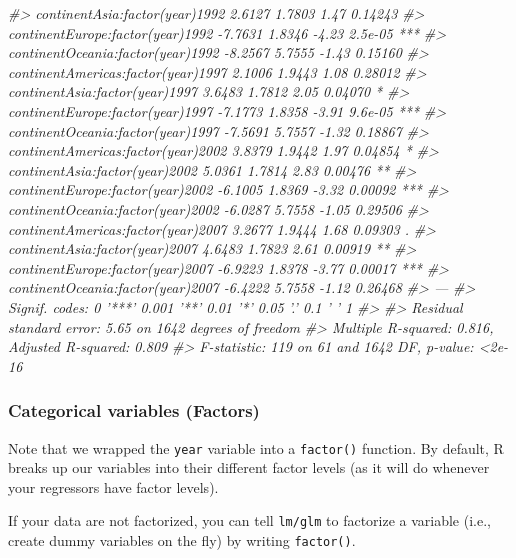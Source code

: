 \documentclass[
]{book}
\newenvironment{Shaded}{\begin{snugshade}}{\end{snugshade}}
\newcommand{\CommentTok}[1]{\textcolor[rgb]{0.56,0.35,0.01}{\textit{#1}}}
\begin{document}
\begin{Shaded}
\begin{Highlighting}[]
\CommentTok{#> continentAsia:factor(year)1992       2.6127     1.7803    1.47  0.14243    }
\CommentTok{#> continentEurope:factor(year)1992    -7.7631     1.8346   -4.23  2.5e-05 ***}
\CommentTok{#> continentOceania:factor(year)1992   -8.2567     5.7555   -1.43  0.15160    }
\CommentTok{#> continentAmericas:factor(year)1997   2.1006     1.9443    1.08  0.28012    }
\CommentTok{#> continentAsia:factor(year)1997       3.6483     1.7812    2.05  0.04070 *  }
\CommentTok{#> continentEurope:factor(year)1997    -7.1773     1.8358   -3.91  9.6e-05 ***}
\CommentTok{#> continentOceania:factor(year)1997   -7.5691     5.7557   -1.32  0.18867    }
\CommentTok{#> continentAmericas:factor(year)2002   3.8379     1.9442    1.97  0.04854 *  }
\CommentTok{#> continentAsia:factor(year)2002       5.0361     1.7814    2.83  0.00476 ** }
\CommentTok{#> continentEurope:factor(year)2002    -6.1005     1.8369   -3.32  0.00092 ***}
\CommentTok{#> continentOceania:factor(year)2002   -6.0287     5.7558   -1.05  0.29506    }
\CommentTok{#> continentAmericas:factor(year)2007   3.2677     1.9444    1.68  0.09303 .  }
\CommentTok{#> continentAsia:factor(year)2007       4.6483     1.7823    2.61  0.00919 ** }
\CommentTok{#> continentEurope:factor(year)2007    -6.9223     1.8378   -3.77  0.00017 ***}
\CommentTok{#> continentOceania:factor(year)2007   -6.4222     5.7558   -1.12  0.26468    }
\CommentTok{#> ---}
\CommentTok{#> Signif. codes:  0 '***' 0.001 '**' 0.01 '*' 0.05 '.' 0.1 ' ' 1}
\CommentTok{#> }
\CommentTok{#> Residual standard error: 5.65 on 1642 degrees of freedom}
\CommentTok{#> Multiple R-squared:  0.816,  Adjusted R-squared:  0.809 }
\CommentTok{#> F-statistic:  119 on 61 and 1642 DF,  p-value: <2e-16}
\end{Highlighting}
\end{Shaded}

\hypertarget{categorical-variables-factors}{%
\subsubsection*{Categorical variables (Factors)}\label{categorical-variables-factors}}

Note that we wrapped the \texttt{year} variable into a \texttt{factor()} function. By default, R breaks up our variables into their different factor levels (as it will do whenever your regressors have factor levels).

If your data are not factorized, you can tell \texttt{lm/glm} to factorize a variable (i.e., create dummy variables on the fly) by writing \texttt{factor()}.
\end{document}
